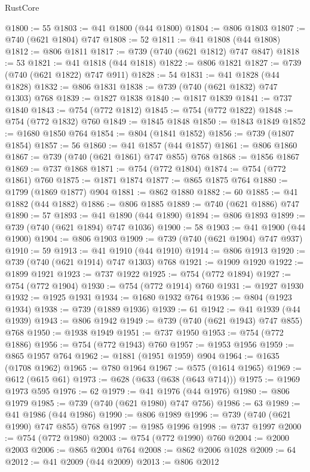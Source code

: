 \begin{lexlean}{RustCore}
\begin{coremodule}
@1800 := 55
@1803 := @41 @1800 (@44 @1800)
@1804 := @806 @1803
@1807 := @740 (@621 @1804) @747
@1808 := 52
@1811 := @41 @1808 (@44 @1808)
@1812 := @806 @1811
@1817 := @739 (@740 (@621 @1812) @747 @847)
@1818 := 53
@1821 := @41 @1818 (@44 @1818)
@1822 := @806 @1821
@1827 := @739 (@740 (@621 @1822) @747 @911)
@1828 := 54
@1831 := @41 @1828 (@44 @1828)
@1832 := @806 @1831
@1838 := @739 (@740 (@621 @1832) @747 @1303) @768
@1839 := @1827 @1838
@1840 := @1817 @1839
@1841 := @737 @1840
@1843 := @754 (@772 @1812)
@1845 := @754 (@772 @1822)
@1848 := @754 (@772 @1832) @760
@1849 := @1845 @1848
@1850 := @1843 @1849
@1852 := @1680 @1850 @764
@1854 := @804 (@1841 @1852)
@1856 := @739 (@1807 @1854)
@1857 := 56
@1860 := @41 @1857 (@44 @1857)
@1861 := @806 @1860
@1867 := @739 (@740 (@621 @1861) @747 @855) @768
@1868 := @1856 @1867
@1869 := @737 @1868
@1871 := @754 (@772 @1804)
@1874 := @754 (@772 @1861) @760
@1875 := @1871 @1874
@1877 := @865 @1875 @764
@1880 := @1799 (@1869 @1877) @904
@1881 := @862 @1880
@1882 := 60
@1885 := @41 @1882 (@44 @1882)
@1886 := @806 @1885
@1889 := @740 (@621 @1886) @747
@1890 := 57
@1893 := @41 @1890 (@44 @1890)
@1894 := @806 @1893
@1899 := @739 (@740 (@621 @1894) @747 @1036)
@1900 := 58
@1903 := @41 @1900 (@44 @1900)
@1904 := @806 @1903
@1909 := @739 (@740 (@621 @1904) @747 @937)
@1910 := 59
@1913 := @41 @1910 (@44 @1910)
@1914 := @806 @1913
@1920 := @739 (@740 (@621 @1914) @747 @1303) @768
@1921 := @1909 @1920
@1922 := @1899 @1921
@1923 := @737 @1922
@1925 := @754 (@772 @1894)
@1927 := @754 (@772 @1904)
@1930 := @754 (@772 @1914) @760
@1931 := @1927 @1930
@1932 := @1925 @1931
@1934 := @1680 @1932 @764
@1936 := @804 (@1923 @1934)
@1938 := @739 (@1889 @1936)
@1939 := 61
@1942 := @41 @1939 (@44 @1939)
@1943 := @806 @1942
@1949 := @739 (@740 (@621 @1943) @747 @855) @768
@1950 := @1938 @1949
@1951 := @737 @1950
@1953 := @754 (@772 @1886)
@1956 := @754 (@772 @1943) @760
@1957 := @1953 @1956
@1959 := @865 @1957 @764
@1962 := @1881 (@1951 @1959) @904
@1964 := @1635 (@1708 @1962)
@1965 := @780 @1964
@1967 := @575 (@1614 @1965)
@1969 := @612 (@615 @61)
@1973 := @628 (@633 (@638 (@643 @714)))
@1975 := @1969 @1973 @595
@1976 := 62
@1979 := @41 @1976 (@44 @1976)
@1980 := @806 @1979
@1985 := @739 (@740 (@621 @1980) @747 @756)
@1986 := 63
@1989 := @41 @1986 (@44 @1986)
@1990 := @806 @1989
@1996 := @739 (@740 (@621 @1990) @747 @855) @768
@1997 := @1985 @1996
@1998 := @737 @1997
@2000 := @754 (@772 @1980)
@2003 := @754 (@772 @1990) @760
@2004 := @2000 @2003
@2006 := @865 @2004 @764
@2008 := @862 @2006 @1028
@2009 := 64
@2012 := @41 @2009 (@44 @2009)
@2013 := @806 @2012

\end{coremodule}
\end{lexlean}

